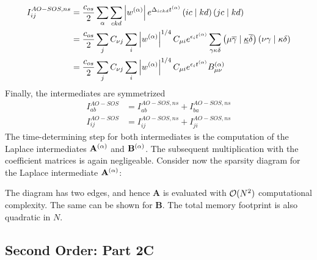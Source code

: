 \begin{align}
I_{ij}^{AO-SOS,ns} &= \frac{c_{os}}{2} \sum_{\alpha} \sum_{ckd} \left\lvert w^{(\alpha)} \right\rvert e^{\Delta_{ickd}t^{(\alpha)}} \left( ic \mid kd \right) \left( jc \mid kd \right) \\
&= \frac{c_{os}}{2} \sum_j C_{\nu j} \sum_i \left\lvert w^{(\alpha)} \right\rvert^{1/4} C_{\mu i} e^{\epsilon_i t^{(\alpha)}} \sum_{\gamma\kappa\delta} \left( \mu\overline{\gamma} \mid \underline{\kappa}\overline{\delta} \right) \left( \nu\gamma \mid \kappa\delta \right) \\
&= \frac{c_{os}}{2} \sum_j C_{\nu j} \sum_i \left\lvert w^{(\alpha)} \right\rvert^{1/4} C_{\mu i} e^{\epsilon_i t^{(\alpha)}} B_{\mu\nu}^{(\alpha)}
\end{align}
\noindent Finally, the intermediates are symmetrized
\begin{align}
I^{AO-SOS}_{ab} &= I^{AO-SOS,ns}_{ab} + I^{AO-SOS,ns}_{ba} \\
I^{AO-SOS}_{ij} &= I^{AO-SOS,ns}_{ij} + I^{AO-SOS,ns}_{ji}
\end{align}
The time-determining step for both intermediates is the computation of the Laplace intermediates $\mathbf{A}^{(\alpha)}$ and $\mathbf{B}^{(\alpha)}$. The subsequent multiplication with the coefficient matrices is again negligeable. Consider now the sparsity diagram for the Laplace intermediate $\mathbf{A}^{(\alpha)}$:
\begin{center}
\end{center}

\noindent The diagram has two edges, and hence $\mathbf{A}$ is evaluated with $\mathcal{O}(N^{2})$ computational complexity. The same can be shown for $\mathbf{B}$. The total memory footprint is also quadratic in $N$. 

\subsection{Second Order: Part 2C}

